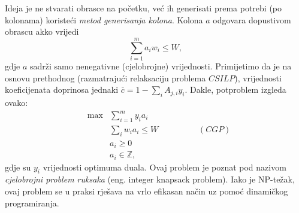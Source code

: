 \documentclass[a4paper, utf8, 11pt, colorlinks]{book}
\begin{document}
 Ideja je ne stvarati obrasce na početku, već ih generisati prema potrebi (po kolonama) koristeći \emph{metod generisanja kolona}. Kolona $a$ odgovara dopustivom obrascu akko vrijedi 
 $$ \sum_{i=1}^m a_i w_i \leq W,$$
 gdje $a$ sadrži samo nenegativne (cjelobrojne) vrijednosti. 
Primijetimo da je na osnovu prethodnog (razmatrajući relaksaciju problema  $CSILP$), vrijednosti koeficijenata doprinosa 
jednaki $\overline{c} = 1 - \sum_{i} A_{j,i} y_i$.  
 Dakle, potproblem izgleda ovako:
$$ \begin{array}{lll}
     &\max& \sum_{i=1}^m y_i a_i \\
     &  &\sum_{i} w_i a_i \leq W \hspace{2cm} (CGP)\\
     & &a_i \geq 0 \\
     & &a_i \in \mathbb{Z},
 \end{array}$$
  gdje su $y_i$ vrijednosti optimuma duala. 
 Ovaj problem je poznat pod nazivom \emph{cjelobrojni problem ruksaka} (eng. integer knapsack problem). Iako je NP-težak, ovaj problem se u praksi rješava na vrlo efikasan način uz pomoć dinamičkog programiranja. 
 
\end{document}
